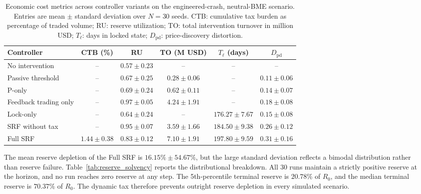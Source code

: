 \documentclass[a4paper,fleqn]{cas-dc}
\begin{document}
\begin{table}[htbp]
\centering
\caption{Economic cost metrics across controller variants on the engineered-crash, neutral-BME scenario. Entries are mean \(\pm\) standard deviation over \(N=30\) seeds. CTB: cumulative tax burden as percentage of traded volume; RU: reserve utilization; TO: total intervention turnover in million USD; \(T_\ell\): days in locked state; \(D_{\mathrm{pd}}\): price-discovery distortion.}
\label{tab:economic_cost}
\begin{tabular}{|l|c|c|c|c|c|}
\hline
\textbf{Controller} & CTB (\%) & RU & TO (M USD) & \(T_\ell\) (days) & \(D_{\mathrm{pd}}\) \\
\hline
No intervention & -- & \(0.57\!\pm\!0.23\) & -- & -- & -- \\
\hline
Passive threshold & -- & \(0.67\!\pm\!0.25\) & \(0.28\!\pm\!0.06\) & -- & \(0.11\!\pm\!0.06\) \\
\hline
P-only & -- & \(0.69\!\pm\!0.24\) & \(0.62\!\pm\!0.11\) & -- & \(0.14\!\pm\!0.07\) \\
\hline
Feedback trading only & -- & \(0.97\!\pm\!0.05\) & \(4.24\!\pm\!1.91\) & -- & \(0.18\!\pm\!0.08\) \\
\hline
Lock-only & -- & \(0.64\!\pm\!0.24\) & -- & \(176.27\!\pm\!7.67\) & \(0.15\!\pm\!0.08\) \\
\hline
SRF without tax & -- & \(0.95\!\pm\!0.07\) & \(3.59\!\pm\!1.66\) & \(184.50\!\pm\!9.38\) & \(0.26\!\pm\!0.12\) \\
\hline
Full SRF & \(1.44\!\pm\!0.38\) & \(0.83\!\pm\!0.12\) & \(7.10\!\pm\!1.91\) & \(197.80\!\pm\!9.59\) & \(0.31\!\pm\!0.16\) \\
\hline
\end{tabular}
\end{table}

The mean reserve depletion of the Full SRF is \(16.15\%\pm54.67\%\), but the large standard deviation reflects a bimodal distribution rather than reserve failure. Table~\ref{tab:reserve_solvency} reports the distributional breakdown. All 30 runs maintain a strictly positive reserve at the horizon, and no run reaches zero reserve at any step. The 5th-percentile terminal reserve is \(20.78\%\) of \(R_0\), and the median terminal reserve is \(70.37\%\) of \(R_0\). The dynamic tax therefore prevents outright reserve depletion in every simulated scenario.
\end{document}
